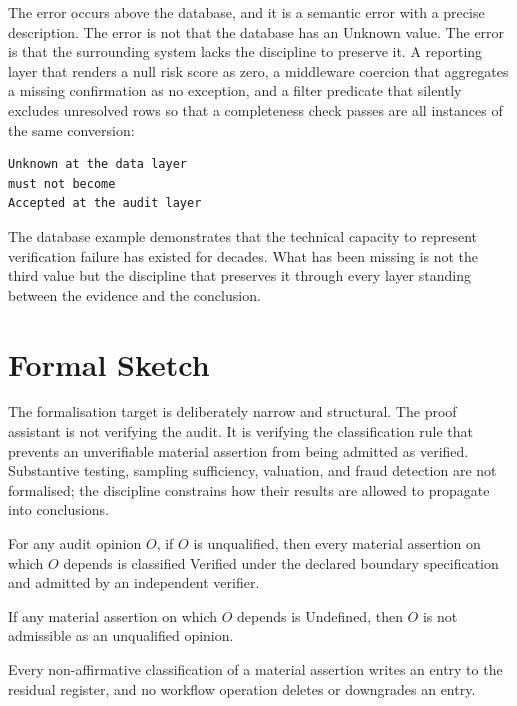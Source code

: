 \documentclass[smallcondensed,envcountsect,natbib]{svjour3}
\newcommand{\state}[1]{\textsf{#1}}
\begin{document}
The error occurs above the database, and it is a semantic error with a precise description. The error is not that the database has an \state{Unknown} value. The error is that the surrounding system lacks the discipline to preserve it. A reporting layer that renders a null risk score as zero, a middleware coercion that aggregates a missing confirmation as no exception, and a filter predicate that silently excludes unresolved rows so that a completeness check passes are all instances of the same conversion:

\begin{lstlisting}
Unknown at the data layer
must not become
Accepted at the audit layer
\end{lstlisting}

The database example demonstrates that the technical capacity to represent verification failure has existed for decades. What has been missing is not the third value but the discipline that preserves it through every layer standing between the evidence and the conclusion.

\section{Formal Sketch}
\label{sec:formal}

The formalisation target is deliberately narrow and structural. The proof assistant is not verifying the audit. It is verifying the classification rule that prevents an unverifiable material assertion from being admitted as verified. Substantive testing, sampling sufficiency, valuation, and fraud detection are not formalised; the discipline constrains how their results are allowed to propagate into conclusions.

\begin{theorem}
\label{thm:main}
For any audit opinion $O$, if $O$ is unqualified, then every material assertion on which $O$ depends is classified \state{Verified} under the declared boundary specification and admitted by an independent verifier.
\end{theorem}

\begin{corollary}[Contrapositive]
\label{cor:contra}
If any material assertion on which $O$ depends is \state{Undefined}, then $O$ is not admissible as an unqualified opinion.
\end{corollary}

\begin{theorem}
\label{thm:residual}
Every non-affirmative classification of a material assertion writes an entry to the residual register, and no workflow operation deletes or downgrades an entry.
\end{theorem}
\end{document}
